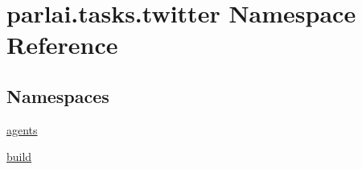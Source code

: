 \hypertarget{namespaceparlai_1_1tasks_1_1twitter}{}\section{parlai.\+tasks.\+twitter Namespace Reference}
\label{namespaceparlai_1_1tasks_1_1twitter}
\subsection*{Namespaces}
\begin{DoxyCompactItemize}
\item 
 \hyperlink{namespaceparlai_1_1tasks_1_1twitter_1_1agents}{agents}
\item 
 \hyperlink{namespaceparlai_1_1tasks_1_1twitter_1_1build}{build}
\end{DoxyCompactItemize}
